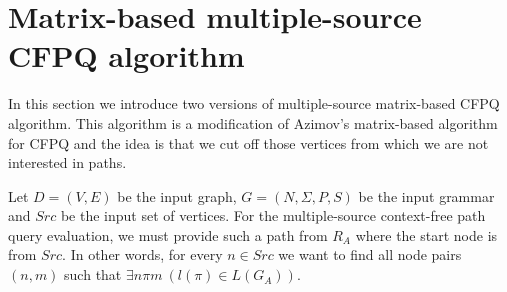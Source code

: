 \section{Matrix-based multiple-source CFPQ algorithm}
\label{sec:multiple-source-algo}
 In this section we introduce two versions of multiple-source matrix-based CFPQ algorithm. This algorithm is a modification of Azimov's matrix-based algorithm for CFPQ and the idea is that we cut off those vertices from which we are not interested in paths.
 
 Let \mbox{$D = (V, E)$} be the input graph, \mbox{$G = (N, \Sigma, P, S)$} be the input grammar and $Src$ be the input set of vertices. For the multiple-source context-free path query evaluation, we must provide such a path from $R_A$ where the start node is from $Src$. In other words, for every \mbox{$n \in Src$} we want to find all node pairs \mbox{$(n,m)$} such that \mbox{$\exists n \pi m~(l(\pi) \in L(G_A))$}.

